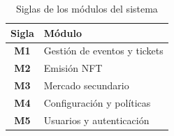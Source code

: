 \documentclass[12pt,letterpaper]{article}
\begin{document}
\begin{table}[htbp]
\centering
\caption{Siglas de los módulos del sistema}
\label{tab:siglas_modulos}
\begin{tabular}{|c|p{8cm}|}
\hline
\textbf{Sigla} & \textbf{Módulo} \\ \hline
\textbf{M1} & Gestión de eventos y tickets \\ \hline
\textbf{M2} & Emisión NFT \\ \hline
\textbf{M3} & Mercado secundario \\ \hline
\textbf{M4} & Configuración y políticas \\ \hline
\textbf{M5} & Usuarios y autenticación \\ \hline
\end{tabular}
\end{table}
\end{document}
